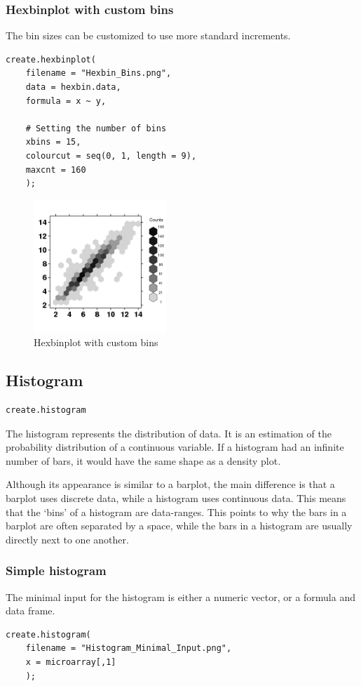 \documentclass[letterpaper]{article}
\begin{document}
\subsubsection{Hexbinplot with custom bins}
The bin sizes can be customized to use more standard increments.
\begin{verbatim}
create.hexbinplot(
    filename = "Hexbin_Bins.png",
    data = hexbin.data,
    formula = x ~ y, 

    # Setting the number of bins
    xbins = 15,
    colourcut = seq(0, 1, length = 9),
    maxcnt = 160
    );
\end{verbatim}

\begin{figure}[!ht]
  \begin{center}
     \includegraphics[width=50mm]{Figures/Hexbin_Bins.png}
     \caption{Hexbinplot with custom bins}
  \end{center}
\end{figure}

\subsection{Histogram}
\begin{verbatim}
create.histogram
\end{verbatim}

The histogram represents the distribution of data. It is an estimation of the probability distribution of a continuous variable. If a histogram had an infinite number of bars, it would have the same shape as a density plot. 

Although its appearance is similar to a barplot, the main difference is that a barplot uses discrete data, while a histogram uses continuous data. This means that the `bins' of a histogram are data-ranges. This points to why the bars in a barplot are often separated by a space, while the bars in a histogram are usually directly next to one another.

\subsubsection{Simple histogram}
The minimal input for the histogram is either a numeric vector, or a formula and data frame.
\begin{verbatim}
create.histogram(
    filename = "Histogram_Minimal_Input.png",
    x = microarray[,1]
    );
\end{verbatim}
\end{document}
